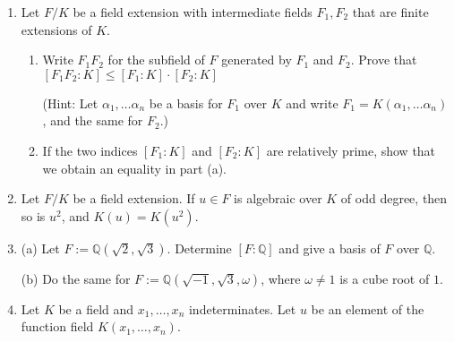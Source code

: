 \documentclass[12pt]{article}
\newcommand{\QQ}{{\mathbb Q}}
\def\defcolor#1{{\color{blue}#1}}
\begin{document}
\begin{enumerate}

\item   Let $F/K$ be a field extension with intermediate fields $F_1,F_2$ that are finite extensions of $K$.
  \begin{enumerate}
  \item Write \defcolor{$F_1F_2$} for the subfield of $F$ generated by  $F_1$ and $F_2$.
    Prove that $[F_1F_2\colon K]\leq[F_1\colon K]\cdot[F_2\colon K]$
    
    (Hint: Let $\alpha_1,\dotsc\alpha_n$ be a basis for $F_1$ over $K$ and write $F_1=K(\alpha_1,\dotsc\alpha_n)$, and the same for $F_2$.)

  \item If the two indices $[F_1\colon K]$ and $[F_2\colon K]$  are relatively prime, show that we obtain an equality in part (a).

  \end{enumerate}
  \vspace{-2pt}


\item    Let $F/K$ be a field extension.
  If $u\in F$ is algebraic over $K$ of odd degree, then so is $u^2$, and $K(u)=K(u^2)$.
\vspace{-2pt}

\item   (a) Let $F:=\QQ(\sqrt{2},\sqrt{3})$.
  Determine $[F\colon\QQ]$ and give a basis of $F$ over $\QQ$.

  (b) Do the same for $F:=\QQ(\sqrt{-1},\sqrt{3},\omega)$, where $\omega\neq 1$ is a cube root of $1$.
\vspace{-2pt}

\item Let $K$ be a field and $x_1,\dotsc,x_n$ indeterminates.
  Let $u$ be an element of the function field $K(x_1,\dotsc,x_n)$.


\end{enumerate}
\end{document}
